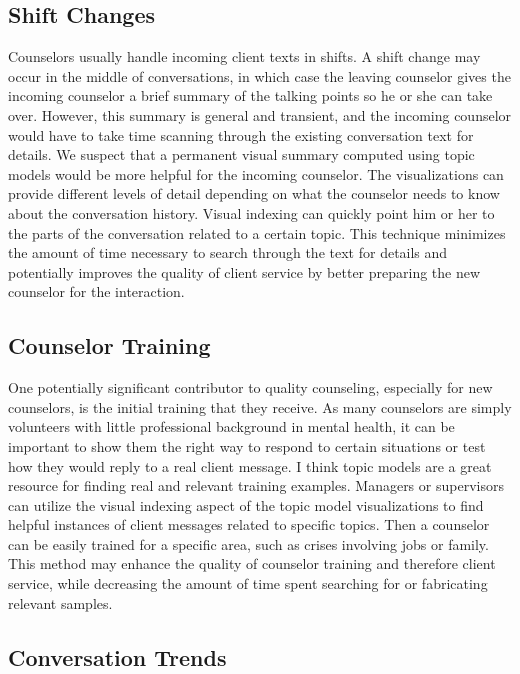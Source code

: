 \subsection{Shift Changes}

Counselors usually handle incoming client texts in shifts. A shift change may occur
in the middle of conversations, in which case the leaving counselor gives the
incoming counselor a brief summary of the talking points so he or she can take
over. However, this summary is general and transient, and the incoming counselor
would have to take time scanning through the existing conversation text for details.
We suspect that a permanent visual summary computed using topic models would be
more helpful for the incoming counselor. The visualizations can provide different
levels of detail depending on what the counselor needs to know about the
conversation history. Visual indexing can quickly point him or her to the parts of
the conversation related to a certain topic. This technique minimizes the amount of
time necessary to search through the text for details and potentially improves the
quality of client service by better preparing the new counselor for the interaction.

\subsection{Counselor Training}

One potentially significant contributor to quality counseling, especially for new
counselors, is the initial training that they receive. As many counselors are simply
volunteers with little professional background in mental health, it can be important
to show them the right way to respond to certain situations or test how they would
reply to a real client message. I think topic models are a great resource for finding
real and relevant training examples. Managers or supervisors can utilize the visual
indexing aspect of the topic model visualizations to find helpful instances of client
messages related to specific topics. Then a counselor can be easily trained for a
specific area, such as crises involving jobs or family. This method may enhance
the quality of counselor training and therefore client service, while decreasing the
amount of time spent searching for or fabricating relevant samples.

\subsection{Conversation Trends}

